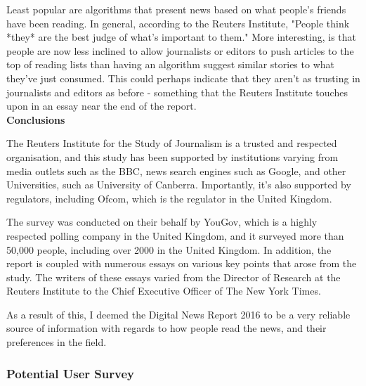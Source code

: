 \documentclass[12pt]{article}
\begin{document}
Least popular are algorithms that present news based on what people's friends have been reading. In general, according to the Reuters Institute\cite{reutersInstitute}, "People think *they* are the best judge of what's important to them." More interesting, is that people are now less inclined to allow journalists or editors to push articles to the top of reading lists than having an algorithm suggest similar stories to what they've just consumed. This could perhaps indicate that they aren't as trusting in journalists and editors as before - something that the Reuters Institute touches upon in an essay near the end of the report. \\

\textbf{Conclusions}

The Reuters Institute for the Study of Journalism is a trusted and respected organisation, and this study has been supported by institutions varying from media outlets such as the BBC\cite{bbc}, news search engines such as Google, and other Universities, such as University of Canberra\cite{canberra}. Importantly, it's also supported by regulators, including Ofcom\cite{ofcom}, which is the regulator in the United Kingdom. 

The survey was conducted on their behalf by YouGov\cite{yougov}, which is a highly respected polling company in the United Kingdom, and it surveyed more than 50,000 people, including over 2000 in the United Kingdom. In addition, the report is coupled with numerous essays on various key points that arose from the study. The writers of these essays varied from the Director of Research at the Reuters Institute to the Chief Executive Officer of The New York Times\cite{newYorkTimes}.

As a result of this, I deemed the Digital News Report 2016\cite{digitalNewsReport} to be a very reliable source of information with regards to how people read the news, and their preferences in the field. 

\subsubsection{Potential User Survey}
\end{document}
